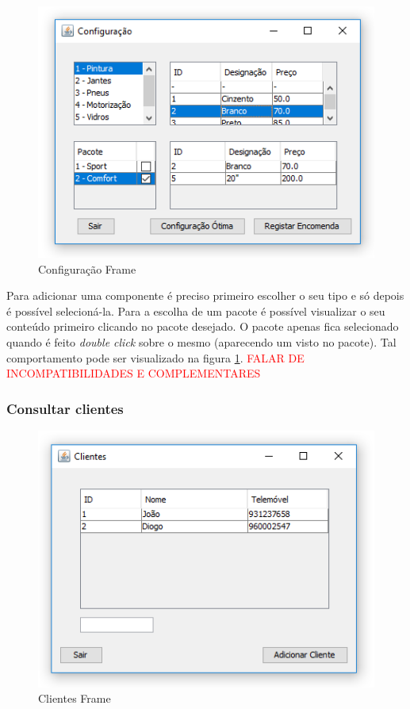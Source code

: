 \documentclass[11pt]{article} %
\begin{document}
\begin{figure}[H]
	\centering
	\includegraphics[]{configframe.png}
	\caption{Configuração Frame}
	\label{configframe}
\end{figure}

Para adicionar uma componente é preciso primeiro escolher o seu tipo e só depois é possível selecioná-la. Para a escolha de um pacote é possível visualizar o seu conteúdo primeiro clicando no pacote desejado. O pacote apenas fica selecionado quando é feito \textit{double click} sobre o mesmo (aparecendo um visto no pacote). Tal comportamento pode ser visualizado na figura \ref{configframe}.
\textcolor{red}{FALAR DE INCOMPATIBILIDADES E COMPLEMENTARES}


\subsubsection{Consultar clientes}
\begin{figure}[H]
	\centering
	\includegraphics[]{clientesframe.png}
	\caption{Clientes Frame}
	\label{clientesframe}
\end{figure}
\end{document}
